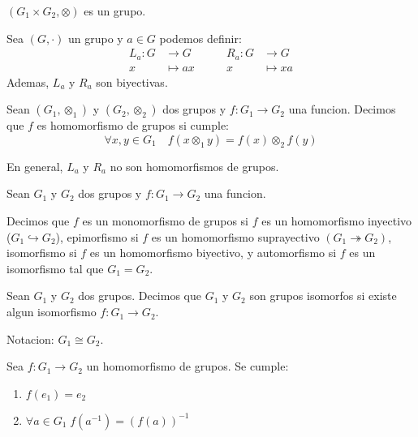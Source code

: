 \begin{proposition}
	\((G_1 \times G_2, \otimes )\) es un grupo.
\end{proposition}
\begin{definition}
	Sea \((G, \cdot )\) un grupo y \(a \in G \) podemos definir:
	\[
		\begin{aligned}
			L_a \colon G & \longrightarrow G \\
			x            & \longmapsto ax
		\end{aligned} \qquad
		\begin{aligned}
			R_a \colon G & \longrightarrow G \\
			x            & \longmapsto  xa
		\end{aligned}
	\]
	Ademas, \(L_a \) y \(R_a \) son biyectivas.
\end{definition}
\begin{definition}[Homomorfismo]
	Sean \((G_1, \otimes_1 )\) y \((G_2, \otimes_2 )\) dos grupos y \(f \colon G_1 \to G_2 \) una funcion. Decimos que \(f \) es homomorfismo de grupos si cumple:
	\[
		\forall x,y \in G_1 \quad f(x \otimes_1 y ) = f(x) \otimes_2 f(y )
	\]
\end{definition}
\begin{remark}
	En general, \(L_a \) y \(R_a \) no son homomorfismos de grupos.
\end{remark}
\begin{definition}
	Sean \(G_1 \) y \(G_2 \) dos grupos y \(f \colon G_1 \to G_2 \) una funcion.
	
	Decimos que \(f \) es un monomorfismo de grupos si \(f \) es un homomorfismo inyectivo (\(G_1 \hookrightarrow G_2	\)),  epimorfismo si \(f \) es un homomorfismo suprayectivo \((G_1 \twoheadrightarrow G_2	)\), isomorfismo si \(f \) es un homomorfismo biyectivo, y automorfismo si \(f \) es un isomorfismo tal que \(G_1 = G_2 \).
\end{definition}
\begin{definition}
	Sean \(G_1 \) y \(G_2 \) dos grupos. Decimos que \(G_1 \) y \(G_2 \) son grupos isomorfos si existe algun isomorfismo \(f \colon G_1 \to G_2 \).
	
	Notacion: \(G_1 \cong G_2 \).
\end{definition}
\begin{proposition}
	Sea \(f \colon G_1 \to G_2 \) un homomorfismo de grupos. Se cumple:
	\begin{enumerate}
		\item \(f(e_1) = e_2 \)
		\item \(\forall a \in G_1 \; f(a^{-1} ) = (f(a))^{-1} \)
	\end{enumerate}
\end{proposition}
